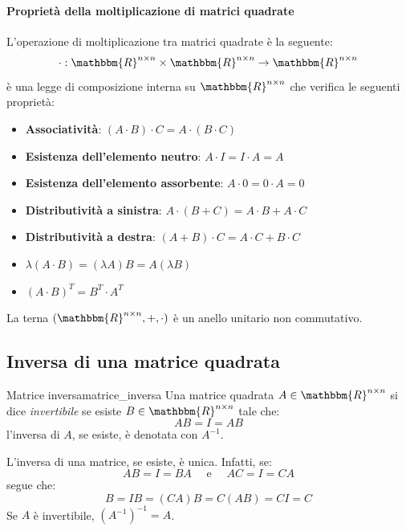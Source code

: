 \documentclass[12pt]{report}
\newcounter{definition}
\newcommand{\nmu}{}
\begin{document}
\paragraph{Proprietà della moltiplicazione di matrici quadrate}
L'operazione di moltiplicazione tra matrici quadrate è la seguente:
\[
\cdot: \mathbbm{R}^{n\times n} \times \mathbbm{R}^{n\times n} \to \mathbbm{R}^{n\times n}
\]
è una legge di composizione interna su $\mathbbm{R}^{n\times n}$ che verifica le seguenti proprietà:
\begin{itemize}
	\item \textbf{Associatività}: $(A \cdot B) \cdot C = A \cdot (B \cdot C)$
	\item \textbf{Esistenza dell'elemento neutro}: $A \cdot I = I \cdot A = A$
	\item \textbf{Esistenza dell'elemento assorbente}: $A \cdot 0 = 0 \cdot A = 0$
	\item \textbf{Distributività a sinistra}: $A \cdot (B + C) = A \cdot B + A \cdot C$
	\item \textbf{Distributività a destra}: $(A + B) \cdot C = A \cdot C + B \cdot C$
	\item $\lambda(A \cdot B) = (\lambda A)B = A(\lambda B)$
	\item $(A \cdot B)^T = B^T \cdot A^T$
\end{itemize}
\begin{note}{}{}
La terna $(\mathbbm{R}^{n\times n}, +, \cdot)$ è un anello unitario non commutativo.
\end{note}
\subsection{Inversa di una matrice quadrata}
\begin{definition}{\nmu Matrice inversa}{matrice_inversa}
	Una matrice quadrata $A \in \mathbbm{R}^{n\times n}$ si dice \textit{invertibile} se esiste $B \in \mathbbm{R}^{n\times n}$ tale che:
	\[
	AB = I = AB
	\]
	l'inversa di $A$, se esiste, è denotata con $A^{-1}$.
\end{definition}
\begin{note}{}{}
L'inversa di una matrice, se esiste, è unica. Infatti, se:
\[
AB = I =  BA  \quad \text{ e } \quad AC = I = CA
\]
segue che:
\[
B = IB = (CA)B = C(AB) = CI = C
\]
Se $A$ è invertibile, $(A^{-1})^{-1} = A$.
\end{note}
\end{document}
